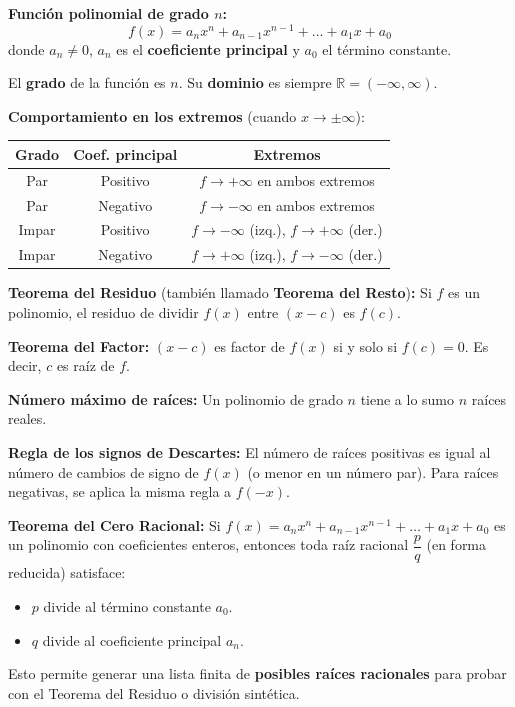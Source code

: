 \documentclass[12pt, a4paper]{article}
\begin{document}
\begin{cuadroteoria}
  \textbf{Función polinomial de grado $n$:}
  $$f(x) = a_n x^n + a_{n-1}x^{n-1} + \dots + a_1 x + a_0$$
  donde $a_n \neq 0$, $a_n$ es el \textbf{coeficiente principal} y $a_0$ el término constante.

  El \textbf{grado} de la función es $n$. Su \textbf{dominio} es siempre $\mathbb{R} = (-\infty, \infty)$.

  \textbf{Comportamiento en los extremos} (cuando $x \to \pm\infty$):
  \begin{center}
    \begin{tabular}{ccc}
      \toprule
      \textbf{Grado} & \textbf{Coef. principal} & \textbf{Extremos}                              \\
      \midrule
      Par            & Positivo                 & $f \to +\infty$ en ambos extremos              \\
      Par            & Negativo                 & $f \to -\infty$ en ambos extremos              \\
      Impar          & Positivo                 & $f \to -\infty$ (izq.), $f \to +\infty$ (der.) \\
      Impar          & Negativo                 & $f \to +\infty$ (izq.), $f \to -\infty$ (der.) \\
      \bottomrule
    \end{tabular}
  \end{center}
\end{cuadroteoria}

\newpage

\begin{cuadrosolucion}
  \textbf{Teorema del Residuo} (también llamado \textbf{Teorema del Resto})\textbf{:} Si $f$ es un polinomio, el residuo de dividir $f(x)$ entre $(x - c)$ es $f(c)$.

  \textbf{Teorema del Factor:} $(x - c)$ es factor de $f(x)$ si y solo si $f(c) = 0$. Es decir, $c$ es raíz de $f$.

  \textbf{Número máximo de raíces:} Un polinomio de grado $n$ tiene a lo sumo $n$ raíces reales.

  \textbf{Regla de los signos de Descartes:} El número de raíces positivas es igual al número de cambios de signo de $f(x)$ (o menor en un número par). Para raíces negativas, se aplica la misma regla a $f(-x)$.
\end{cuadrosolucion}

\begin{cuadroextra}
  \textbf{Teorema del Cero Racional:} Si $f(x) = a_n x^n + a_{n-1}x^{n-1} + \dots + a_1 x + a_0$ es un polinomio con coeficientes enteros, entonces toda raíz racional $\dfrac{p}{q}$ (en forma reducida) satisface:
  \begin{itemize}[leftmargin=*]
    \item $p$ divide al término constante $a_0$.
    \item $q$ divide al coeficiente principal $a_n$.
  \end{itemize}
  Esto permite generar una lista finita de \textbf{posibles raíces racionales} para probar con el Teorema del Residuo o división sintética.
\end{cuadroextra}
\end{document}
